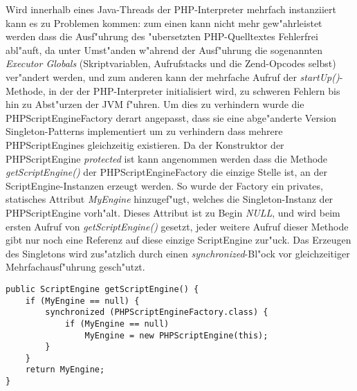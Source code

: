 Wird innerhalb eines Java-Threads der PHP-Interpreter mehrfach instanziiert kann es zu Problemen
kommen: zum einen kann nicht mehr gew"ahrleistet werden dass die Ausf"uhrung des "ubersetzten
PHP-Quelltextes Fehlerfrei abl"auft, da unter Umst"anden w"ahrend der Ausf"uhrung die sogenannten
\emph{Executor Globals} (Skriptvariablen, Aufrufstacks und die Zend-Opcodes selbst) ver"andert werden,
und zum anderen kann der mehrfache Aufruf der \emph{startUp()}-Methode, in der der PHP-Interpreter
initialisiert wird, zu schweren Fehlern bis hin zu Abst"urzen der JVM f"uhren. Um dies zu verhindern
wurde die PHPScriptEngineFactory derart angepasst, dass sie eine abge"anderte Version Singleton-Patterns
implementiert um zu verhindern dass mehrere PHPScriptEngines gleichzeitig existieren. 
Da der Konstruktor der PHPScriptEngine \emph{protected} ist kann angenommen werden dass die 
Methode \emph{getScriptEngine()} der PHPScriptEngineFactory die einzige Stelle ist, an der
ScriptEngine-Instanzen erzeugt werden. So wurde der Factory ein privates, statisches Attribut \emph{MyEngine} 
hinzugef"ugt, welches die Singleton-Instanz der PHPScriptEngine vorh"alt. Dieses Attribut ist zu Begin
\emph{NULL}, und wird beim ersten Aufruf von \emph{getScriptEngine()} gesetzt, jeder weitere Aufruf
dieser Methode gibt nur noch eine Referenz auf diese einzige ScriptEngine zur"uck. Das Erzeugen des
Singletons wird zus"atzlich durch einen \emph{synchronized}-Bl"ock vor gleichzeitiger
Mehrfachausf"uhrung gesch"utzt.
\begin{lstlisting}[caption=Singleton-Erzeugung]
public ScriptEngine getScriptEngine() {
    if (MyEngine == null) {
        synchronized (PHPScriptEngineFactory.class) {
            if (MyEngine == null)
                MyEngine = new PHPScriptEngine(this);
        }
    }
    return MyEngine;
}
\end{lstlisting}


